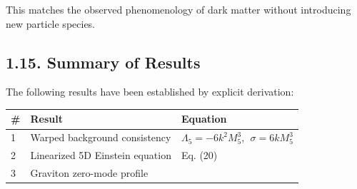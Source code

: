 \documentclass[
  11pt,
]{article}
\begin{document}
This matches the observed phenomenology of dark matter without
introducing new particle species.

\bigskip

\hypertarget{summary-of-results}{%
\subsection{1.15. Summary of Results}\label{summary-of-results}}

The following results have been established by explicit derivation:

\begin{longtable}[]{@{}lll@{}}
\toprule
\begin{minipage}[b]{0.13\columnwidth}\raggedright
\#\strut
\end{minipage} & \begin{minipage}[b]{0.35\columnwidth}\raggedright
Result\strut
\end{minipage} & \begin{minipage}[b]{0.43\columnwidth}\raggedright
Equation\strut
\end{minipage}\tabularnewline
\midrule
\endhead
\begin{minipage}[t]{0.13\columnwidth}\raggedright
1\strut
\end{minipage} & \begin{minipage}[t]{0.35\columnwidth}\raggedright
Warped background consistency\strut
\end{minipage} & \begin{minipage}[t]{0.43\columnwidth}\raggedright
\(\Lambda_5 = -6k^2 M_5^3\), \(\;\sigma = 6kM_5^3\)\strut
\end{minipage}\tabularnewline
\begin{minipage}[t]{0.13\columnwidth}\raggedright
2\strut
\end{minipage} & \begin{minipage}[t]{0.35\columnwidth}\raggedright
Linearized 5D Einstein equation\strut
\end{minipage} & \begin{minipage}[t]{0.43\columnwidth}\raggedright
Eq. (20)\strut
\end{minipage}\tabularnewline
\begin{minipage}[t]{0.13\columnwidth}\raggedright
3\strut
\end{minipage} & \begin{minipage}[t]{0.35\columnwidth}\raggedright
Graviton zero-mode profile\strut
\end{minipage} & \begin{minipage}[t]{0.43\columnwidth}\raggedright

\end{minipage}
\end{longtable}
\end{document}
